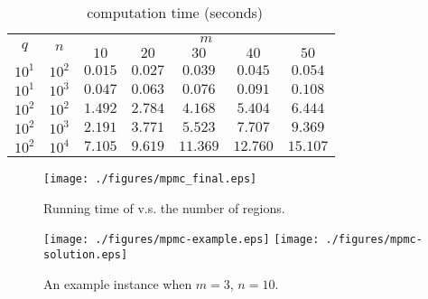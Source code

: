 \begin{table}[ht!]
    \vspace*{-2mm}
    \footnotesize
    \centering
    \begin{tabular}{|c|c|c|c|c|c|c|} 
        \hline
        \multirow{2}{*}{$q$} & \multirow{2}{*}{$n$} & \multicolumn{5}{|c|}{$m$} \\ \cline{3-7}
        \rule{0pt}{2.5ex} & & $10$ & $20$ & $30$ & $40$ & $50$ \\ \hline
        \rule{0pt}{2.5ex} $10^1$ & $10^2$ & $ 0.015$ & $ 0.027$ & $ 0.039$ & $ 0.045$ & $ 0.054$ \\ \hline
        \rule{0pt}{2.5ex} $10^1$ & $10^3$ & $ 0.047$ & $ 0.063$ & $ 0.076$ & $ 0.091$ & $ 0.108$ \\ \hline
        \rule{0pt}{2.5ex} $10^2$ & $10^2$ & $ 1.492$ & $ 2.784$ & $ 4.168$ & $ 5.404$ & $ 6.444$ \\ \hline
        \rule{0pt}{2.5ex} $10^2$ & $10^3$ & $ 2.191$ & $ 3.771$ & $ 5.523$ & $ 7.707$ & $ 9.369$ \\ \hline
        \rule{0pt}{2.5ex} $10^2$ & $10^4$ & $ 7.105$ & $ 9.619$ & $11.369$ & $12.760$ & $15.107$ \\ \hline
    \end{tabular}
    \vspace*{-2mm}
    \caption{\label{eval:mpmc:2} \algoMRG~computation time (seconds)}
    \vspace*{-4mm}
\end{table}

\begin{figure}[ht!]
    \centering
    \texttt{[image: ./figures/mpmc\_final.eps]}
    \vspace*{-2mm}
    \caption{\label{fig:mpmc:m}Running time of \algoMRG 
		v.s. the number of regions.}
    \vspace*{-2mm}
\end{figure}

\begin{figure}[ht!]
    \centering
    \texttt{[image: ./figures/mpmc-example.eps]}
    \texttt{[image: ./figures/mpmc-solution.eps]}
    \vspace*{-3mm}
    \caption{\label{fig:mpmc-ex} An example instance when $m = 3$, $n = 10$.} 
    \vspace*{-4mm}
\end{figure}

